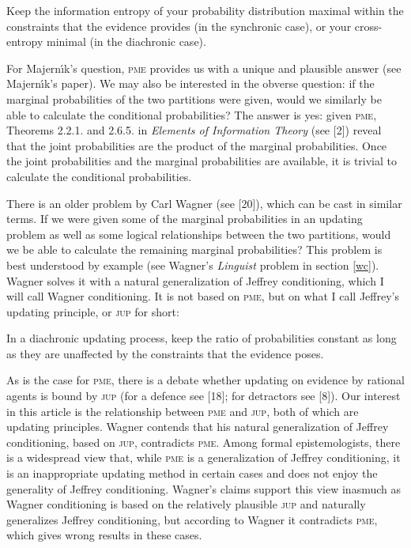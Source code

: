 \begin{quotex}
   Keep the information entropy of your probability
  distribution maximal within the constraints that the evidence
  provides (in the synchronic case), or your cross-entropy minimal (in
  the diachronic case).
\end{quotex}

For Majern{\'\i}k's question, \textsc{pme} provides us with a unique and
plausible answer (see Majern{\'\i}k's paper). We may also be interested in
the obverse question: if the marginal probabilities of the two
partitions were given, would we similarly be able to calculate the
conditional probabilities? The answer is yes: given \textsc{pme},
Theorems 2.2.1. and 2.6.5. in \emph{Elements of Information Theory}
(see [2]) reveal that the joint probabilities
are the product of the marginal probabilities. Once the joint
probabilities and the marginal probabilities are available, it is
trivial to calculate the conditional probabilities.

There is an older problem by Carl Wagner (see [20]), which can be cast
in similar terms. If we were given some of the marginal probabilities
in an updating problem as well as some logical relationships between
the two partitions, would we be able to calculate the remaining
marginal probabilities? This problem is best understood by example
(see Wagner's \emph{Linguist} problem in section \ref{wc}). Wagner
solves it with a natural generalization of Jeffrey conditioning, which
I will call Wagner conditioning. It is not based on \textsc{pme}, but
on what I call Jeffrey's updating principle, or \textsc{jup} for
short:

\begin{quotex}
   In a diachronic updating process, keep the ratio of
  probabilities constant as long as they are unaffected by the
  constraints that the evidence poses.
\end{quotex}

As is the case for \textsc{pme}, there is a debate whether updating on
evidence by rational agents is bound by \textsc{jup} (for a defence
see [18]; for detractors see [8]). Our interest in this article is the
relationship between \textsc{pme} and \textsc{jup}, both of which are
updating principles. Wagner contends that his natural generalization
of Jeffrey conditioning, based on \textsc{jup}, contradicts
\textsc{pme}. Among formal epistemologists, there is a widespread view
that, while \textsc{pme} is a generalization of Jeffrey conditioning,
it is an inappropriate updating method in certain cases and does not
enjoy the generality of Jeffrey conditioning. Wagner's claims support
this view inasmuch as Wagner conditioning is based on the relatively
plausible \textsc{jup} and naturally generalizes Jeffrey conditioning,
but according to Wagner it contradicts \textsc{pme}, which gives wrong
results in these cases.

